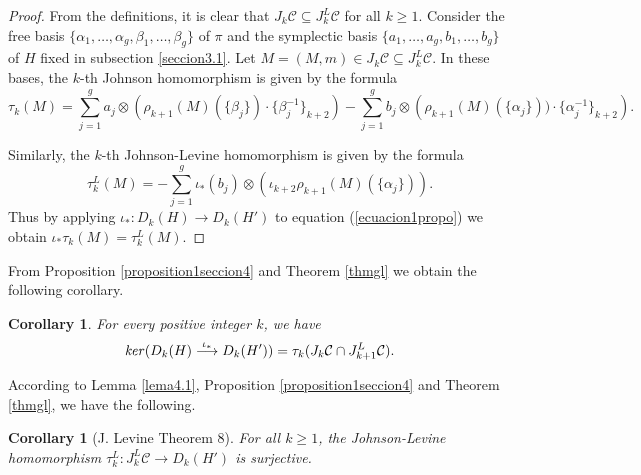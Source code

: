 \documentclass[10pt]{amsart}
\numberwithin{equation}{section}
\numberwithin{equation}{section}
\newtheorem{corollary}[theorem]{Corollary}
\theoremstyle{definition}
\begin{document}
\begin{proof}
From the definitions, it is clear that   $J_k\mathcal{C}\subseteq J_k^L\mathcal{C}$ for all $k\geq1$. Consider the free basis $\{\alpha_1,\ldots,\alpha_g,\beta_1,\ldots,\beta_g\}$ of $\pi$  and the symplectic basis   $\{a_1,\ldots, a_g, b_1,\ldots,b_g\}$ of $H$ fixed in subsection \ref{seccion3.1}. Let $M=(M,m)\in J_k\mathcal{C}\subseteq J_k^L\mathcal{C}$. In these  bases, the $k$-th Johnson homomorphism is given by the formula
\begin{equation}\label{ecuacion1propo}
\tau_k(M)=\sum_{j=1}^g a_j\otimes\left(\rho_{k+1}(M)(\{\beta_j\})\cdot \{\beta_j^{-1}\}_{k+2}\right)-\sum_{j=1}^g b_j\otimes\left(\rho_{k+1}(M)(\{\alpha_j\}))\cdot \{\alpha_j^{-1}\}_{k+2}\right).
\end{equation}

\noindent Similarly, the $k$-th Johnson-Levine homomorphism is given by the formula
\begin{equation}\label{ecuacion2propo}
\tau_k^L(M)=-\sum_{j=1}^g \iota_*(b_j)\otimes\left(\iota_{k+2}\rho_{k+1}(M)(\{\alpha_j\})\right). 
\end{equation}
\noindent Thus by applying $\iota_*:D_k(H)\rightarrow D_k(H')$ to equation (\ref{ecuacion1propo}) we obtain $\iota_*\tau_k(M)=\tau_k^L(M)$.
\end{proof}

From Proposition \ref{proposition1seccion4} and Theorem \ref{thmgl} we obtain the following corollary.

\begin{corollary}\label{corollaryequ4.3} For every positive integer $k$, we have
\begin{equation}\label{ecuacion4.3}%
 \text{\emph{ker}}(D_k(H)\stackrel{\iota_*}{\longrightarrow} D_k(H'))=\tau_k(J_k\mathcal{C}\cap J_{k+1}^L\mathcal{C}).
\end{equation}
\end{corollary}

According to  Lemma \ref{lema4.1}, Proposition \ref{proposition1seccion4} and Theorem \ref{thmgl}, we have the following.

\begin{corollary}[J. Levine \cite{MR1823501} Theorem 8]\label{proposicion4.1} For all $k\geq 1$, the Johnson-Levine homomorphism $\tau_k^L:J_k^L\mathcal{C}\rightarrow D_k (H')$ is surjective.
\end{corollary} 
\end{document}
